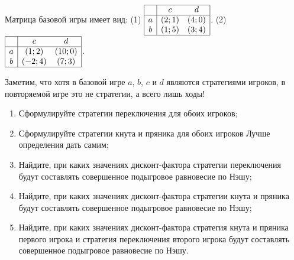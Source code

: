 \begin{problem}

Матрица базовой игры имеет вид:  (1) $\begin{array}{|c|cc|}  \hline {} & {c} & {d} \\  \hline {a} & {\left(2;1\right)} & {\left(4;0\right)} \\ {b} & {\left(1;5\right)} & {\left(3;4\right)} \\  \hline  \end{array}$.
(2) $\begin{array}{|c|cc|}  \hline {} & {c} & {d} \\  \hline {a} & {\left(1;2\right)} & {\left(10;0\right)} \\ {b} & {\left(-2;4\right)} & {\left(7;3\right)} \\  \hline  \end{array}$.

Заметим, что хотя в базовой игре  $a$,  $b$,  $c$  и  $d$  являются стратегиями игроков, в повторяемой игре это не стратегии, а всего лишь ходы!\par
\begin{enumerate}
\item Сформулируйте стратегии переключения для обоих игроков;\par
\item Сформулируйте стратегии кнута и пряника для обоих игроков {\red Лучше определения дать самим};\par

\item  Найдите, при каких значениях дисконт-фактора стратегии переключения будут составлять совершенное подыгровое равновесие по Нэшу;\par
\item Найдите, при каких значениях дисконт-фактора стратегии кнута и пряника будут составлять совершенное подыгровое равновесие по Нэшу;\par
\item Найдите, при каких значениях дисконт-фактора стратегия кнута и пряника первого игрока и стратегия переключения второго игрока будут составлять совершенное подыгровое равновесие по Нэшу.
\end{enumerate}


\begin{sol}

\end{sol}
\end{problem}



